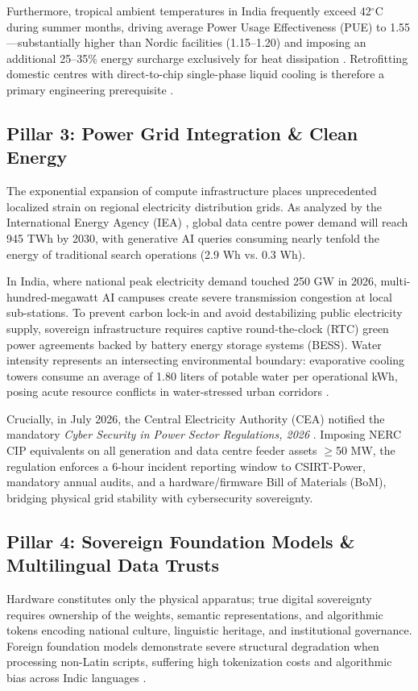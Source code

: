 \documentclass[conference,a4paper]{IEEEtran}
\begin{document}
Furthermore, tropical ambient temperatures in India frequently exceed 42$^\circ$C during summer months, driving average Power Usage Effectiveness (PUE) to 1.55—substantially higher than Nordic facilities (1.15–1.20) and imposing an additional 25–35\% energy surcharge exclusively for heat dissipation \cite{sbichakra2026}. Retrofitting domestic centres with direct-to-chip single-phase liquid cooling is therefore a primary engineering prerequisite \cite{ieee_tcpmt2026cooling}.

\subsection{Pillar 3: Power Grid Integration \& Clean Energy}
The exponential expansion of compute infrastructure places unprecedented localized strain on regional electricity distribution grids. As analyzed by the International Energy Agency (IEA) \cite{iea2024energy}, global data centre power demand will reach 945 TWh by 2030, with generative AI queries consuming nearly tenfold the energy of traditional search operations (2.9 Wh vs. 0.3 Wh).

In India, where national peak electricity demand touched 250 GW in 2026, multi-hundred-megawatt AI campuses create severe transmission congestion at local sub-stations. To prevent carbon lock-in and avoid destabilizing public electricity supply, sovereign infrastructure requires captive round-the-clock (RTC) green power agreements backed by battery energy storage systems (BESS). Water intensity represents an intersecting environmental boundary: evaporative cooling towers consume an average of 1.80 liters of potable water per operational kWh, posing acute resource conflicts in water-stressed urban corridors \cite{iea2024energy, lbnl2025energy}.

Crucially, in July 2026, the Central Electricity Authority (CEA) notified the mandatory \textit{Cyber Security in Power Sector Regulations, 2026} \cite{denexus2026cea}. Imposing NERC CIP equivalents on all generation and data centre feeder assets $\ge$50 MW, the regulation enforces a 6-hour incident reporting window to CSIRT-Power, mandatory annual audits, and a hardware/firmware Bill of Materials (BoM), bridging physical grid stability with cybersecurity sovereignty.

\subsection{Pillar 4: Sovereign Foundation Models \& Multilingual Data Trusts}
Hardware constitutes only the physical apparatus; true digital sovereignty requires ownership of the weights, semantic representations, and algorithmic tokens encoding national culture, linguistic heritage, and institutional governance. Foreign foundation models demonstrate severe structural degradation when processing non-Latin scripts, suffering high tokenization costs and algorithmic bias across Indic languages \cite{thakker2026sovereign}.
\end{document}
